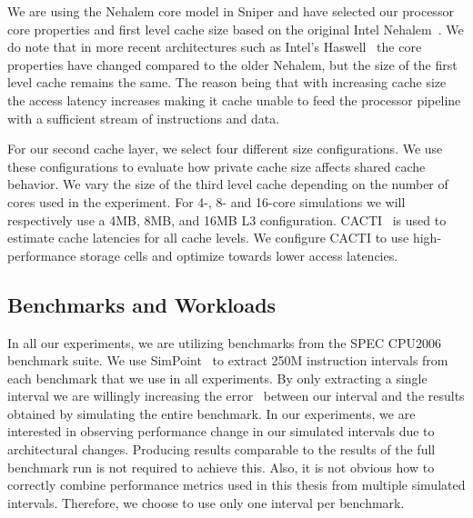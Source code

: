 We are using the Nehalem core model in Sniper and have selected our processor core properties and first level cache size based on the original Intel Nehalem~\cite{Thomadakis2011}. 
We do note that in more recent architectures such as Intel's Haswell~\cite{Jain2013} the core properties have changed compared to the older Nehalem, but the size of the first level cache remains the same.
The reason being that with increasing cache size the access latency increases making it cache unable to feed the processor pipeline with a sufficient stream of instructions and data.

For our second cache layer, we select four different size configurations.
We use these configurations to evaluate how private cache size affects shared cache behavior.
We vary the size of the third level cache depending on the number of cores used in the experiment.
For 4-, 8- and 16-core simulations we will respectively use a 4MB, 8MB, and 16MB L3 configuration.
CACTI~\cite{Shivakumar2001} is used to estimate cache latencies for all cache levels.
We configure CACTI to use high-performance storage cells and optimize towards lower access latencies.


\subsection{Benchmarks and Workloads}
In all our experiments, we are utilizing benchmarks from the SPEC CPU2006~\cite{SPECCPU2006} benchmark suite. 
We use SimPoint~\cite{Hamerly2005} to extract 250M instruction intervals from each benchmark that we use in all experiments.
By only extracting a single interval we are willingly increasing the error~\cite{Hamerly2004} between our interval and the results obtained by simulating the entire benchmark.
In our experiments, we are interested in observing performance change in our simulated intervals due to architectural changes.
Producing results comparable to the results of the full benchmark run is not required to achieve this.
Also, it is not obvious how to correctly combine performance metrics used in this thesis from multiple simulated intervals.
Therefore, we choose to use only one interval per benchmark.

